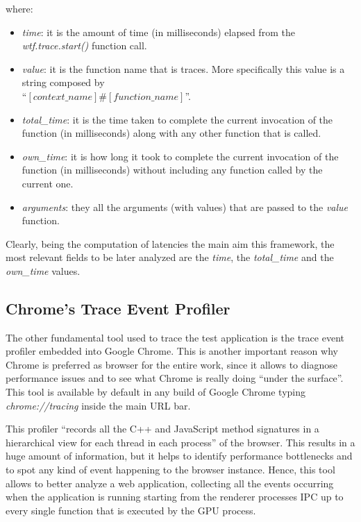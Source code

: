 where:
\begin{itemize}
    \item \emph{time}: it is the amount of time (in milliseconds) elapsed from the
        \emph{wtf.trace.start()} function call.
    \item \emph{value}: it is the function name that is traces. More specifically this
        value is a string composed by\\
        ``\([context\_name]\#[function\_name]\)''.
    \item \emph{total\_time}: it is the time taken to complete the current invocation
        of the function (in milliseconds) along with any other function that
        is called.
    \item \emph{own\_time}: it is how long it took to complete the current invocation
        of the function (in milliseconds) without including any function called by
        the current one.
    \item \emph{arguments}: they all the arguments (with values) that are passed
        to the \emph{value} function.
\end{itemize}

Clearly, being the computation of latencies the main aim this framework, the most
relevant fields to be later analyzed are the \emph{time}, the \emph{total\_time}
and the \emph{own\_time} values.


\subsection{Chrome's Trace Event Profiler}\label{sec:chrome_trace_event_prof}
The other fundamental tool used to trace the test application is the trace
event profiler embedded into Google Chrome. This is another important reason why
Chrome is preferred as browser for the entire work, since it allows to diagnose
performance issues and to see what Chrome is really doing ``under the surface''.
This tool is available by default in any build of Google Chrome typing
\emph{chrome://tracing} inside the main URL bar.

This profiler ``records all the C++ and JavaScript method signatures in a
hierarchical view for each thread in each process'' of the browser. This results
in a huge amount of information, but it helps to identify performance bottlenecks
and to spot any kind of event happening to the browser instance. Hence, this tool
allows to
better analyze a web application, collecting all the events occurring when the
application is running starting from the renderer processes IPC up to every single
function that is executed by the GPU process.

